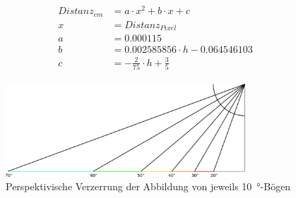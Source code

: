 \documentclass[a4paper]{report}
\begin{document}
\begin{align*}
	\begin{split}
		Distanz_{cm} &= a\cdot x^2 + b\cdot x + c
		\\
		x &= Distanz_{Pixel}
		\\
		a &= 0.000115
		\\
		b &= 0.002585856 \cdot h - 0.064546103
		\\
		c &= -\frac{2}{75} \cdot h + \frac{3}{5}
	\end{split}
\end{align*}

\begin{figure}[h]
	\centering
	\includegraphics[keepaspectratio, width=0.8\textwidth]{Perspektive}
	\caption{Perspektivische Verzerrung der Abbildung von jeweils \SI{10}{\degree}-Bögen}
	\label{fig:Perspektive}
\end{figure}
\end{document}
